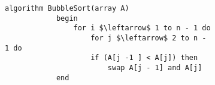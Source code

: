 \documentclass{subfiles}
\begin{document}
\begin{figure}[!h]
    \centering
    \begin{subfigure}[b]{0.5\textwidth}
        \begin{lstlisting}[language = algol]
            algorithm BubbleSort(array A)
            begin
                for i $\leftarrow$ 1 to n - 1 do
                    for j $\leftarrow$ 2 to n - 1 do
                    if (A[j -1 ] < A[j]) then
                        swap A[j - 1] and A[j]
            end
        \end{lstlisting}
    \end{subfigure}
    \label{Fig:}
\end{figure}
\end{document}
